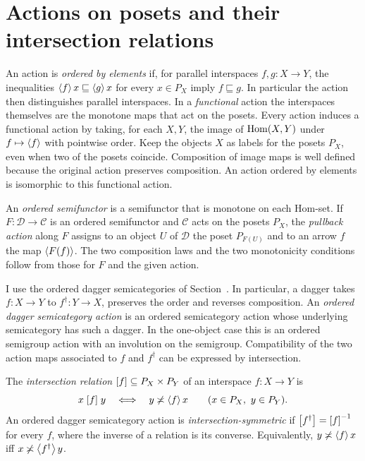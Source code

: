 \section[Intersection relations]{Actions on posets and their intersection relations}
\label{sec-osa-intersection}

An action is \emph{ordered by elements} if, for parallel interspaces
$f,g:X\to Y$, the inequalities $\left\langle f\right\rangle x\sqsubseteq\left\langle g\right\rangle x$
for every $x\in P_X$ imply $f\sqsubseteq g$. In particular the action
then distinguishes parallel interspaces. In a \emph{functional} action
the interspaces themselves are the monotone maps that act on the posets.
Every action induces a functional action by taking, for each $X,Y$,
the image of $\operatorname{Hom}(X,Y)$ under $f\mapsto\left\langle f\right\rangle$ with pointwise
order. Keep the objects $X$ as labels for the posets $P_X$, even when
two of the posets coincide. Composition of image maps is well defined
because the original action preserves composition. An action ordered
by elements is isomorphic to this functional action.

An \emph{ordered semifunctor} is a semifunctor that is monotone on each
Hom-set. If $F:\mathcal D\to\mathcal C$ is an ordered semifunctor and
$\mathcal C$ acts on the posets $P_X$, the \emph{pullback action} along
$F$ assigns to an object $U$ of $\mathcal D$ the poset $P_{F(U)}$ and
to an arrow $f$ the map $\left\langle F(f)\right\rangle$. The two composition laws and
the two monotonicity conditions follow from those for $F$ and the given
action.

I use the ordered dagger semicategories of
Section~. In particular, a dagger
takes $f:X\to Y$ to $f^\dagger:Y\to X$, preserves the order and
reverses composition. An \emph{ordered dagger semicategory action}
is an ordered semicategory action whose underlying semicategory has
such a dagger. In the one-object case this is an ordered semigroup
action with an involution on the semigroup. Compatibility of the two
action maps associated to $f$ and $f^\dagger$ can be expressed by
intersection.

\begin{defn}\label{def-osa-relation}
The \emph{intersection relation} $\mathord{\mathrel{\left[f\right]}}\subseteq P_X\times P_Y$
of an interspace $f:X\to Y$ is
\[
 x\mathrel{\left[f\right]}y\quad\Longleftrightarrow\quad y\not\asymp\left\langle f\right\rangle x
 \qquad(x\in P_X,\ y\in P_Y).
\]
An ordered dagger semicategory action is \emph{intersection-symmetric}
if $\mathord{\mathrel{\left[f^\dagger\right]}}=\mathord{\mathrel{\left[f\right]}}^{-1}$ for every $f$,
where the inverse of a relation is its converse. Equivalently,
$y\not\asymp\left\langle f\right\rangle x$ iff $x\not\asymp\left\langle f^\dagger\right\rangle y$.
\end{defn}

